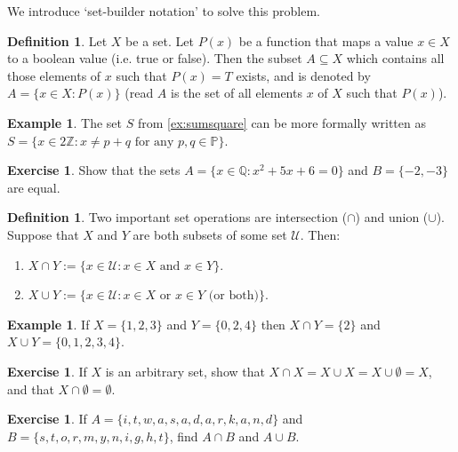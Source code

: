 \documentclass[a4paper]{amsart}
\theoremstyle{definition}
\newtheorem{defn}[thm]{Definition}
\newtheorem{ex}[thm]{Example}
\newtheorem{exercise}[thm]{Exercise}
\theoremstyle{remark}
\begin{document}
We introduce `set-builder notation' to solve this problem.
\begin{defn}
  Let $ X $ be a set.  Let $ P(x) $ be a function that maps a value $ x \in X $ to a boolean value (i.e. true or false). Then
  the subset $ A \subseteq X $ which contains all those elements of $ x $ such that $ P(x) = T $ exists, and is denoted by
  $ A = \{ x \in X : P(x) \} $ (read $ A $ is the set of all elements $ x $ of $ X $ such that $ P(x) $).
\end{defn}

\begin{ex}
  The set $ S $ from \cref{ex:sumsquare} can be more formally written as $ S = \{ x \in 2\mathbb{Z}: x \neq p + q \text{ for any } p, q \in \mathbb{P}\} $.
\end{ex}

\begin{exercise}
  Show that the sets $ A = \{x \in \mathbb{Q} : x^2 + 5x + 6 = 0 \} $ and $ B = \{-2, -3\} $ are equal.
\end{exercise}

\begin{defn}
  Two important set operations are intersection ($ \cap $) and union ($ \cup $). Suppose that $ X $ and $ Y $ are both
  subsets of some set $ \mathcal{U} $. Then:
  \begin{enumerate}
    \item $ X \cap Y := \{x \in \mathcal{U} : x \in X \text{ and } x \in Y \}. $
    \item $ X \cup Y := \{x \in \mathcal{U} : x \in X \text{ or } x \in Y \text{ (or both)}\}. $
  \end{enumerate}
\end{defn}

\begin{ex}
  If $ X = \{1, 2, 3\} $ and $ Y = \{0, 2, 4\} $ then $ X \cap Y = \{2\} $ and $ X \cup Y = \{0, 1, 2, 3, 4\} $.
\end{ex}

\begin{exercise}
  If $ X $ is an arbitrary set, show that $ X \cap X = X \cup X = X \cup \emptyset = X $, and that $ X \cap \emptyset = \emptyset $.
\end{exercise}

\begin{exercise}
  If $ A = \{i,\allowbreak t,\allowbreak w,\allowbreak a,\allowbreak s,\allowbreak a,\allowbreak d,\allowbreak a,\allowbreak r,\allowbreak k,
  \allowbreak a,\allowbreak n,\allowbreak d\} $ and $ B = \{s,\allowbreak t,\allowbreak o,\allowbreak r,\allowbreak m,\allowbreak y,\allowbreak n,
  \allowbreak i,\allowbreak g,\allowbreak h,\allowbreak t\} $, find $ A \cap B $ and $ A \cup B $.
\end{exercise}
\end{document}
